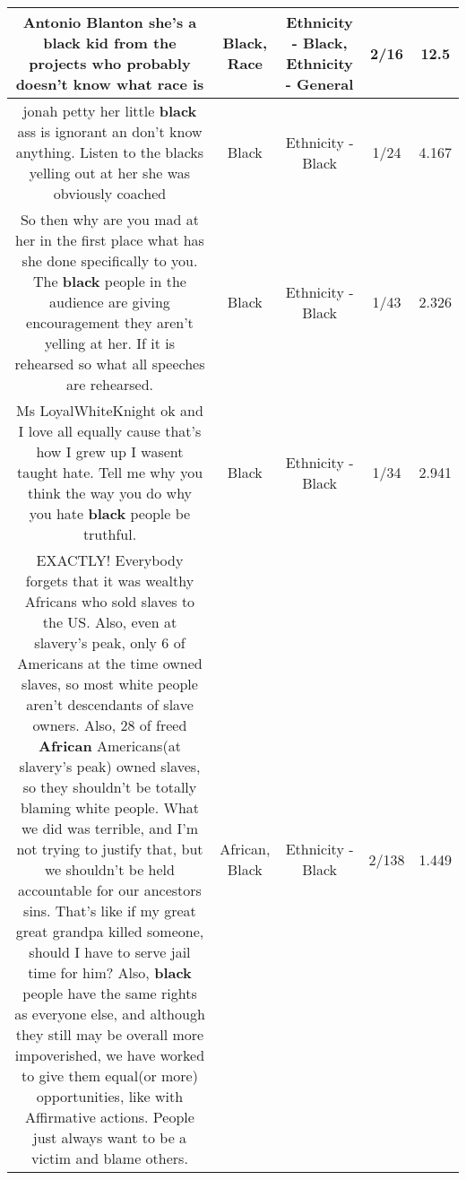 \documentclass[11pt]{article}
\newlength\mylength
\begin{document}
\begin{center}
\begin{longtable}{|C{.65\mylength}|C{.30\mylength}|C{.12\mylength}|C{.12\mylength}|C{.12\mylength}|}
  \small Antonio Blanton she's a \textbf{black} kid from the projects who probably doesn't know what \textbf{race} is\normalsize   & Black, Race & Ethnicity - Black, Ethnicity - General & 2/16 & 12.5 \\  \hline
  \small jonah petty her little \textbf{black} ass is ignorant an don't know anything. Listen to the blacks yelling out at her she was obviously coached\normalsize   & Black & Ethnicity - Black & 1/24 & 4.167 \\  \hline
  \small So then why are you mad at her in the first place what has she done specifically to you. The \textbf{black} people in the audience are giving encouragement they aren't yelling at her. If it is rehearsed so what all speeches are rehearsed.\normalsize   & Black & Ethnicity - Black & 1/43 & 2.326 \\  \hline
  \small Ms LoyalWhiteKnight ok and I love all equally cause that's how I grew up I wasent taught hate. Tell me why you think the way you do why you hate \textbf{black} people be truthful.\normalsize   & Black & Ethnicity - Black & 1/34 & 2.941 \\  \hline
  \small EXACTLY! Everybody forgets that it was wealthy Africans who sold slaves to the US. Also, even at slavery's peak, only 6 of Americans at the time owned slaves, so most white people aren't descendants of slave owners. Also, 28 of freed \textbf{African} Americans(at slavery's peak) owned slaves, so they shouldn't be totally blaming white people. What we did was terrible, and I'm not trying to justify that, but we shouldn't be held accountable for our ancestors sins. That's like if my great great grandpa killed someone, should I have to serve jail time for him? Also, \textbf{black} people have the same rights as everyone else, and although they still may be overall more impoverished, we have worked to give them equal(or more) opportunities, like with Affirmative actions. People just always want to be a victim and blame others.\normalsize   & African, Black & Ethnicity - Black & 2/138 & 1.449 \\  \hline

\end{longtable}
\end{center}
\end{document}

